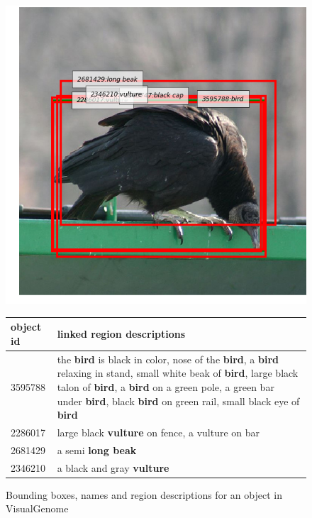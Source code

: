 \begin{figure}
\begin{center}
\includegraphics[scale=0.25]{figures/vulture.png} 
\begin{tabular}{lp{6cm}}
object id & linked region descriptions\\
\hline
3595788 & the \textbf{bird} is black in color, nose of the \textbf{bird}, a \textbf{bird} relaxing in stand, small white beak of \textbf{bird}, large black talon of \textbf{bird}, a \textbf{bird} on a green pole, a green bar under \textbf{bird}, black \textbf{bird} on green rail, small black eye of \textbf{bird}\\
2286017 & large black \textbf{vulture} on fence, a vulture on bar\\
2681429 & a semi \textbf{long beak}\\  
2346210 & a black and gray \textbf{vulture}\\
 \end{tabular}
\caption{Bounding boxes, names and region descriptions for an object in VisualGenome}
\label{fig:bird}
\end{center}
\end{figure}

